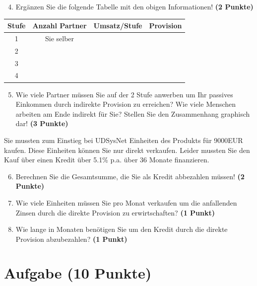 \documentclass[a4paper, 9pt]{scrartcl}\usepackage[]{graphicx}\usepackage[]{xcolor}
\begin{document}
\begin{enumerate}
  \setcounter{enumi}{3}
\item Erg{\"a}nzen Sie die folgende Tabelle mit den obigen Informationen! \textbf{(2 Punkte)}
\end{enumerate}

\begin{center}
\begin{tabular}{c|c|c|c}
  \toprule
  \textbf{Stufe} & \textbf{Anzahl Partner}  & \textbf{Umsatz/Stufe} & \textbf{Provision}\\
  \midrule
  1 & Sie selber  &  & \\ \midrule
  2 &   &  &  \\ \midrule
  3 &   &  &  \\ \midrule
  4 &   &  &  \\
  \bottomrule
\end{tabular}
\end{center}

\begin{enumerate}
  \setcounter{enumi}{4}
\item Wie viele Partner m{\"u}ssen Sie auf der 2 Stufe anwerben um Ihr passives
  Einkommen durch indirekte Provision zu erreichen? Wie viele Menschen
  arbeiten am Ende indirekt f{\"u}r Sie? Stellen Sie den
  Zusammenhang graphisch dar!  \textbf{(3 Punkte)}
\end{enumerate}

Sie mussten zum Einstieg bei UDSysNet Einheiten des Produkts
f{\"u}r 9000EUR kaufen. Diese Einheiten k{\"o}nnen Sie nur direkt
verkaufen. Leider mussten Sie den Kauf {\"u}ber einen Kredit {\"u}ber
5.1\% p.a. {\"u}ber 36 Monate finanzieren.

\begin{enumerate}
  \setcounter{enumi}{5}
\item Berechnen Sie die Gesamtsumme, die Sie als Kredit abbezahlen m{\"u}ssen! \textbf{(2 Punkte)}
\item Wie viele Einheiten m{\"u}ssen Sie pro Monat verkaufen um die anfallenden Zinsen
  durch die direkte Provision zu erwirtschaften? \textbf{(1 Punkt)}
\item Wie lange in
  Monaten ben{\"o}tigen Sie um den Kredit durch die direkte
  Provision abzubezahlen? \textbf{(1 Punkt)}
\end{enumerate} 
\clearpage

\section{Aufgabe \hfill (10 Punkte)}
\end{document}
